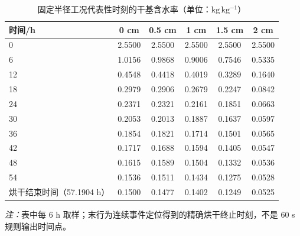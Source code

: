 \begin{table}[htbp]
\centering
\caption{固定半径工况代表性时刻的干基含水率（单位：$\mathrm{kg\,kg^{-1}}$）}
\label{tab:t5}
\begin{tabular}{lccccc}
\toprule
时间/h & 0 cm & 0.5 cm & 1 cm & 1.5 cm & 2 cm \\
\midrule
0 & 2.5500 & 2.5500 & 2.5500 & 2.5500 & 2.5500 \\
6 & 1.0156 & 0.9868 & 0.9006 & 0.7546 & 0.5335 \\
12 & 0.4548 & 0.4418 & 0.4019 & 0.3289 & 0.1640 \\
18 & 0.2979 & 0.2906 & 0.2679 & 0.2247 & 0.0842 \\
24 & 0.2371 & 0.2321 & 0.2161 & 0.1851 & 0.0663 \\
30 & 0.2053 & 0.2013 & 0.1887 & 0.1637 & 0.0597 \\
36 & 0.1854 & 0.1821 & 0.1714 & 0.1501 & 0.0565 \\
42 & 0.1717 & 0.1688 & 0.1594 & 0.1405 & 0.0547 \\
48 & 0.1615 & 0.1589 & 0.1504 & 0.1332 & 0.0536 \\
54 & 0.1536 & 0.1511 & 0.1434 & 0.1275 & 0.0528 \\
烘干结束时间（57.1904 h） & 0.1500 & 0.1477 & 0.1402 & 0.1249 & 0.0525 \\
\bottomrule
\end{tabular}
\parbox{0.88\linewidth}{\footnotesize\textit{注：}表中每 6 h 取样；末行为连续事件定位得到的精确烘干终止时刻，不是 60 s 规则输出时间点。}
\end{table}
